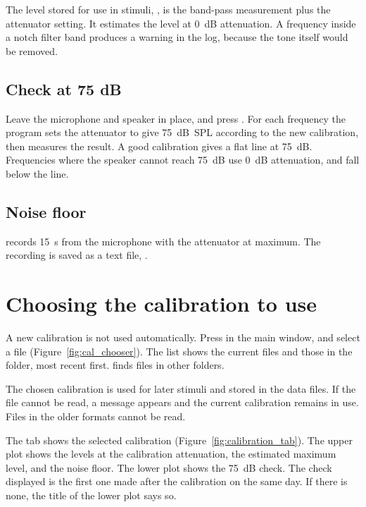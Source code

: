 The level stored for use in stimuli, , is the band-pass measurement plus the
attenuator setting. It estimates the level at 0~dB attenuation. A frequency inside a
notch filter band produces a warning in the log, because the tone itself would be
removed.

\subsection{Check at 75 dB}

Leave the microphone and speaker in place, and press . For
each frequency the program sets the attenuator to give 75~dB~SPL according to the new
calibration, then measures the result. A good calibration gives a flat line at 75~dB.
Frequencies where the speaker cannot reach 75~dB use 0~dB attenuation, and fall below
the line.


\subsection{Noise floor}

 records 15~s from the microphone with the attenuator at maximum. The
recording is saved as a text file, .

\section{Choosing the calibration to use}
\label{sec:cal-select}

A new calibration is not used automatically. Press  in the main
window, and select a file (Figure~\ref{fig:cal_chooser}). The list shows the current
files and those in the  folder, most recent first.
 finds files in other folders.


The chosen calibration is used for later stimuli and stored in the data files. If the
file cannot be read, a message appears and the current calibration remains in use.
Files in the older formats cannot be read.

The  tab shows the selected calibration
(Figure~\ref{fig:calibration_tab}). The upper plot shows the levels at the calibration
attenuation, the estimated maximum level, and the noise floor. The lower plot shows the
75~dB check. The check displayed is the first one made after the calibration on the same
day. If there is none, the title of the lower plot says so.

